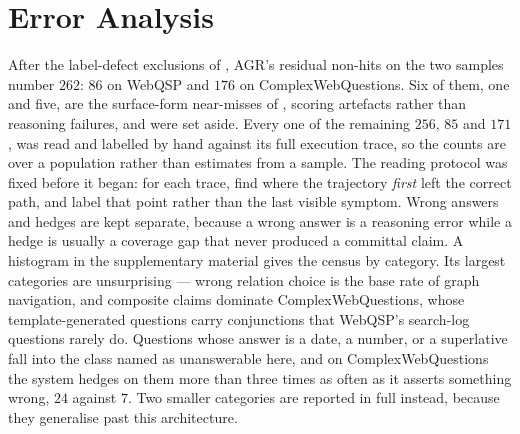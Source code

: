 %
%
%

\section{Error Analysis}\label{sec:erroranalysis}

After the label-defect exclusions of , AGR's residual
non-hits on the two samples number $262$: $86$ on WebQSP and $176$ on
ComplexWebQuestions. Six of them, one and five, are the surface-form
near-misses of , scoring artefacts rather than
reasoning failures, and were set aside. Every one of the remaining
$256$, $85$ and $171$, was read and labelled by hand against its full
execution trace, so the counts are over a population rather than
estimates from a sample. The reading protocol was fixed before it began:
for each trace, find where the trajectory \emph{first} left the correct
path, and label that point rather than the last visible symptom. Wrong
answers and hedges are kept separate, because a wrong answer is a
reasoning error while a hedge is usually a coverage gap that never
produced a committal claim. A histogram in the supplementary material
gives the census by category. Its largest categories are unsurprising
--- wrong relation choice is the base rate of graph navigation, and
composite claims dominate ComplexWebQuestions, whose template-generated
questions carry conjunctions that WebQSP's search-log questions rarely
do. Questions whose answer is a date, a number, or a superlative fall
into the class  named as unanswerable here, and on
ComplexWebQuestions the system hedges on them more than three times as
often as it asserts something wrong, $24$ against $7$. Two smaller
categories are reported in full instead, because they generalise past
this architecture.

